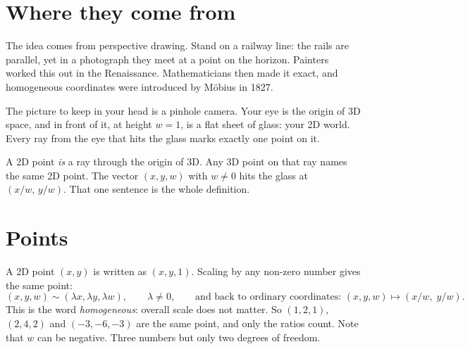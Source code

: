 \documentclass[11pt,a4paper]{article}
\begin{document}
\section{Where they come from}

The idea comes from perspective drawing. Stand on a railway line: the rails are parallel, yet in a photograph they meet at
a point on the horizon. Painters worked this out in the Renaissance. Mathematicians then made it exact, and homogeneous
coordinates were introduced by M\"obius in 1827.

The picture to keep in your head is a pinhole camera. Your eye is the origin of 3D space, and in front of it, at height
$w=1$, is a flat sheet of glass: your 2D world. Every ray from the eye that hits the glass marks exactly one point on it.

\begin{center}
\end{center}

\begin{plainbox}
A 2D point \emph{is} a ray through the origin of 3D. Any 3D point on that ray names the same 2D point. The vector
$(x,y,w)$ with $w\ne0$ hits the glass at $(x/w,\,y/w)$. That one sentence is the whole definition.
\end{plainbox}

\section{Points}

A 2D point $(x,y)$ is written as $(x,y,1)$. Scaling by any non-zero number gives the same point:
\[
(x,y,w)\sim(\lambda x,\lambda y,\lambda w),\qquad \lambda\ne0,
\qquad\text{and back to ordinary coordinates: }(x,y,w)\mapsto(x/w,\;y/w).
\]
This is the word \emph{homogeneous}: overall scale does not matter. So $(1,2,1)$, $(2,4,2)$ and $(-3,-6,-3)$ are the same
point, and only the ratios count. Note that $w$ can be negative. Three numbers but only two degrees of freedom.
\end{document}
